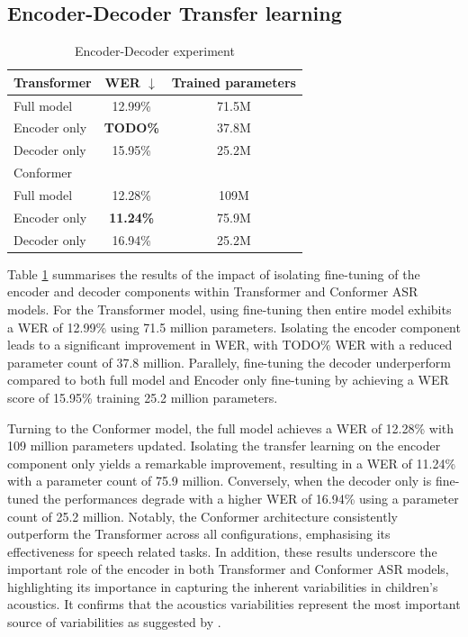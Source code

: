 \subsection{Encoder-Decoder Transfer learning}
\begin{table}
    \begin{center}
        \begin{tabular}{lcc}\hline
            Transformer    &   WER $\downarrow$    & Trained parameters  \\ \hline
            Full model          & 12.99\% & 71.5M   \\
            Encoder only & \textbf{TODO\%} & 37.8M  \\
            Decoder only & 15.95\% & 25.2M  \\ \hline \hline
            Conformer    &    & \\ \hline
            Full model          & 12.28\% & 109M   \\
            Encoder only & \textbf{11.24\%} & 75.9M  \\
            Decoder only & 16.94\% & 25.2M  \\ \hline 

        \end{tabular}
    \end{center}
    \caption{Encoder-Decoder experiment}
    \label{tab:EncoderDecoder}
\end{table}
Table \ref{tab:EncoderDecoder} summarises the results of the impact of isolating fine-tuning of the encoder and decoder components within Transformer and Conformer ASR models. For the Transformer model, using fine-tuning then entire model exhibits a WER of 12.99\% using 71.5 million parameters. Isolating the encoder component leads to a significant improvement in WER, with TODO\% WER with a reduced parameter count of 37.8 million. Parallely, fine-tuning the decoder underperform compared to both full model and Encoder only fine-tuning by achieving a WER score of 15.95\% training 25.2 million parameters. 

Turning to the Conformer model, the full model achieves a WER of 12.28\% with 109 million parameters updated. Isolating the transfer learning on the encoder component only  yields a remarkable improvement, resulting in a WER of 11.24\% with a parameter count of 75.9 million. Conversely, when the decoder only is fine-tuned the performances degrade with a higher WER of 16.94\% using a parameter count of 25.2 million. Notably, the Conformer architecture consistently outperform the Transformer across all configurations, emphasising its effectiveness for speech related tasks. In addition, these results underscore the important role of the encoder in both Transformer and Conformer ASR models, highlighting its importance in capturing the inherent variabilities in children's acoustics. It confirms that the acoustics variabilities represent the most important source of variabilities as suggested by \cite{TFchildren}.

